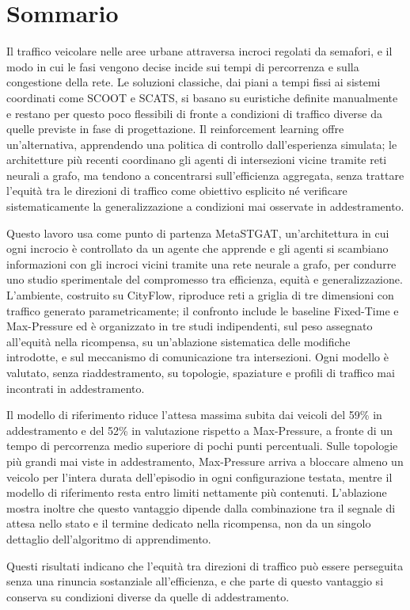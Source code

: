 \chapter*{Sommario}

Il traffico veicolare nelle aree urbane attraversa incroci regolati da
semafori, e il modo in cui le fasi vengono decise incide sui tempi di
percorrenza e sulla congestione della rete. Le soluzioni classiche, dai
piani a tempi fissi ai sistemi coordinati come SCOOT e SCATS, si basano
su euristiche definite manualmente e restano per questo poco flessibili
di fronte a condizioni di traffico diverse da quelle previste in fase di
progettazione. Il reinforcement learning offre un'alternativa,
apprendendo una politica di controllo dall'esperienza simulata; le
architetture più recenti coordinano gli agenti di intersezioni vicine
tramite reti neurali a grafo, ma tendono a concentrarsi sull'efficienza
aggregata, senza trattare l'equità tra le direzioni di traffico come
obiettivo esplicito né verificare sistematicamente la generalizzazione a
condizioni mai osservate in addestramento.

Questo lavoro usa come punto di partenza MetaSTGAT, un'architettura in
cui ogni incrocio è controllato da un agente che apprende e gli agenti si
scambiano informazioni con gli incroci vicini tramite una rete neurale a
grafo, per condurre uno studio sperimentale del compromesso tra
efficienza, equità e generalizzazione. L'ambiente, costruito su CityFlow,
riproduce reti a griglia di tre dimensioni con traffico generato
parametricamente; il confronto include le baseline Fixed-Time e
Max-Pressure ed è organizzato in tre studi indipendenti, sul peso
assegnato all'equità nella ricompensa, su un'ablazione sistematica delle
modifiche introdotte, e sul meccanismo di comunicazione tra intersezioni.
Ogni modello è valutato, senza riaddestramento, su topologie, spaziature
e profili di traffico mai incontrati in addestramento.

Il modello di riferimento riduce l'attesa massima subita dai veicoli del
59\% in addestramento e del 52\% in valutazione rispetto a Max-Pressure,
a fronte di un tempo di percorrenza medio superiore di pochi punti
percentuali. Sulle topologie più grandi mai viste in addestramento,
Max-Pressure arriva a bloccare almeno un veicolo per l'intera durata
dell'episodio in ogni configurazione testata, mentre il modello di
riferimento resta entro limiti nettamente più contenuti. L'ablazione
mostra inoltre che questo vantaggio dipende dalla combinazione tra il
segnale di attesa nello stato e il termine dedicato nella ricompensa, non
da un singolo dettaglio dell'algoritmo di apprendimento.

Questi risultati indicano che l'equità tra direzioni di traffico può
essere perseguita senza una rinuncia sostanziale all'efficienza, e che
parte di questo vantaggio si conserva su condizioni diverse da quelle di
addestramento.
